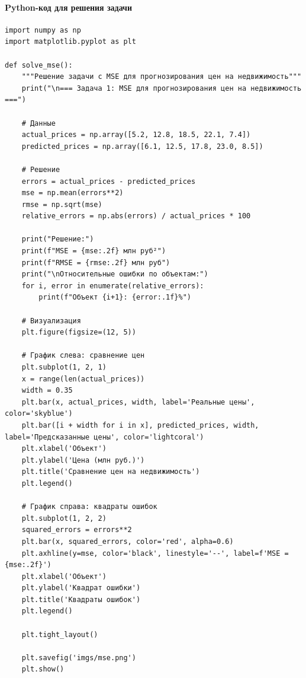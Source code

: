 \paragraph*{Python-код для решения задачи}

\begin{verbatim}
import numpy as np
import matplotlib.pyplot as plt

def solve_mse():
    """Решение задачи с MSE для прогнозирования цен на недвижимость"""
    print("\n=== Задача 1: MSE для прогнозирования цен на недвижимость ===")
    
    # Данные
    actual_prices = np.array([5.2, 12.8, 18.5, 22.1, 7.4])
    predicted_prices = np.array([6.1, 12.5, 17.8, 23.0, 8.5])
    
    # Решение
    errors = actual_prices - predicted_prices
    mse = np.mean(errors**2)
    rmse = np.sqrt(mse)
    relative_errors = np.abs(errors) / actual_prices * 100
    
    print("Решение:")
    print(f"MSE = {mse:.2f} млн руб²")
    print(f"RMSE = {rmse:.2f} млн руб")
    print("\nОтносительные ошибки по объектам:")
    for i, error in enumerate(relative_errors):
        print(f"Объект {i+1}: {error:.1f}%")
    
    # Визуализация
    plt.figure(figsize=(12, 5))
    
    # График слева: сравнение цен
    plt.subplot(1, 2, 1)
    x = range(len(actual_prices))
    width = 0.35
    plt.bar(x, actual_prices, width, label='Реальные цены', color='skyblue')
    plt.bar([i + width for i in x], predicted_prices, width, label='Предсказанные цены', color='lightcoral')
    plt.xlabel('Объект')
    plt.ylabel('Цена (млн руб.)')
    plt.title('Сравнение цен на недвижимость')
    plt.legend()
    
    # График справа: квадраты ошибок
    plt.subplot(1, 2, 2)
    squared_errors = errors**2
    plt.bar(x, squared_errors, color='red', alpha=0.6)
    plt.axhline(y=mse, color='black', linestyle='--', label=f'MSE = {mse:.2f}')
    plt.xlabel('Объект')
    plt.ylabel('Квадрат ошибки')
    plt.title('Квадраты ошибок')
    plt.legend()
    
    plt.tight_layout()
    
    plt.savefig('imgs/mse.png')
    plt.show()
\end{verbatim}


